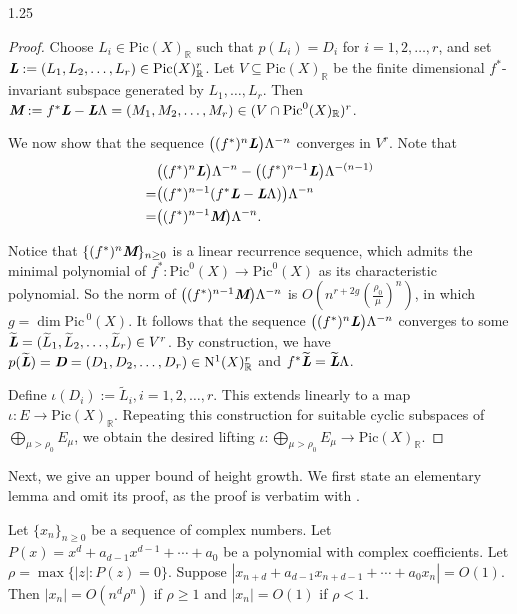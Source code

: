 \documentclass[12pt]{amsart}
\newcommand{\mb}[1]{\mathbb{#1}}
\newcommand{\mr}[1]{\mathrm{#1}}
\newcommand\ra{\rightarrow}
\newcommand\wt{\widetilde}
\newcommand\Pic{\mathrm{Pic\,}}
\newcommand{\mib}[1]{\textit{\textbf{#1}}}
\begin{document}
\begin{spacing}{1.25}
\begin{proof}
Choose $L_i\in \mr{Pic}(X)_{\mb{R}}$ such that $p(L_i)=D_i$ for $i=1,2,\ldots,r$, and set $\mib{L}:=(L_1,L_2,\ldots,L_r)\in \mr{Pic}(X)_{\mb{R}}^{r}$. Let $V\subseteq\mr{Pic}(X)_{\mb{R}}$ be the finite dimensional $f^*$-invariant subspace generated by $L_1,\dots,L_r$. Then $\mib{M}:=f^*\mib{L}-\mib{L}\Lambda=(M_1,M_2,\ldots,M_r) \in (V\cap\mr{Pic}^0(X)_{\mb{R}})^r$.

We now show that the sequence $\big((f^*)^n\mib{L}\big)\Lambda^{-n}$ converges in $V^{r}$. Note that
\[
\begin{aligned}
&\big((f^*)^n\mib{L}\big)\Lambda^{-n}-\big((f^*)^{n-1}\mib{L}\big)\Lambda^{-(n-1)}\\
=&\big((f^{*})^{n-1}(f^*\mib{L}-\mib{L}\Lambda)\big)\Lambda^{-n}  \\
=&\big((f^{*})^{n-1}\mib{M}\big)\Lambda^{-n}. \\
\end{aligned}
\]

Notice that $\{(f^*)^n\mib{M}\}_{n\geq0}$ is a linear recurrence sequence, which admits the minimal polynomial of $f^*:\mr{Pic}^0(X)\rightarrow\mr{Pic}^0(X)$ as its characteristic polynomial. So the norm of $\big((f^{*})^{n-1}\mib{M}\big)\Lambda^{-n}$ is $O(n^{r+2g}(\frac{\rho_0}{\mu})^n)$, in which $g=\dim\Pic^0(X)$. It follows that the sequence $\big((f^*)^n\mib{L}\big)\Lambda^{-n}$ converges to some $\wt{\mib{L}}=(\wt{L}_1,\wt{L}_2,\ldots,\wt{L}_r)\in V^{r}$. By construction, we have $p(\wt{\mib{L}})=\mib{D}=(D_1,D_2,\ldots,D_r)\in\mr{N}^1(X)_{\mb{R}}^{r}$ and $f^*\wt{\mib{L}}=\wt{\mib{L}}\Lambda$.

Define $\iota(D_i):=\wt{L}_i, i=1,2,\ldots,r$. This extends linearly to a map $\iota: E\ra \mr{Pic}(X)_{\mb{R}}$. Repeating this construction for suitable cyclic subspaces of $\bigoplus\limits_{\mu>\rho_0}E_{\mu}$, we obtain the desired lifting $\iota:\bigoplus\limits_{\mu>\rho_0}E_{\mu} \ra \mr{Pic}(X)_{\mb{R}}$.
\end{proof}

Next, we give an upper bound of height growth. We first state an elementary lemma and omit its proof, as the proof is verbatim with \cite[Lemma 3.2]{XY}.

\begin{lemma}\label{Lem_poly}
Let $\{x_n\}_{n\geq0}$ be a sequence of complex numbers. Let $P(x)=x^d+a_{d-1}x^{d-1}+\cdots+a_0$ be a polynomial with complex coefficients. Let $\rho=\max\{|z|:P(z)=0\}$. Suppose $|x_{n+d}+a_{d-1}x_{n+d-1}+\cdots+a_0x_n|=O(1)$. Then $|x_n|=O(n^d\rho^n)$ if $\rho\geq1$ and $|x_n|=O(1)$ if $\rho<1$.
\end{lemma}


\end{spacing}
\end{document}
